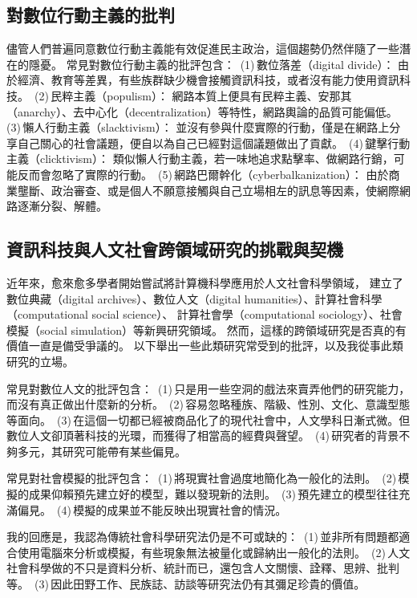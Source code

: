 \documentclass[letterpaper, 10pt, conference]{ieeeconf}   %
\begin{document}
\begin{CJK*}{UTF8}{bsmi}
\subsection*{對數位行動主義的批判}

儘管人們普遍同意數位行動主義能有效促進民主政治，這個趨勢仍然伴隨了一些潛在的隱憂。
常見對數位行動主義的批評包含：
\,(1)\,數位落差（digital divide）：
由於經濟、教育等差異，有些族群缺少機會接觸資訊科技，或者沒有能力使用資訊科技。
\,(2)\,民粹主義（populism）：
網路本質上便具有民粹主義、安那其（anarchy）、去中心化（decentralization）等特性，網路輿論的品質可能偏低。
\,(3)\,懶人行動主義（slacktivism）：
並沒有參與什麼實際的行動，僅是在網路上分享自己關心的社會議題，便自以為自己已經對這個議題做出了貢獻。
\,(4)\,鍵擊行動主義（clicktivism）：
類似懶人行動主義，若一味地追求點擊率、做網路行銷，可能反而會忽略了實際的行動。
\,(5)\,網路巴爾幹化（cyberbalkanization）：
由於商業壟斷、政治審查、或是個人不願意接觸與自己立場相左的訊息等因素，使網際網路逐漸分裂、解體。

\subsection*{資訊科技與人文社會跨領域研究的挑戰與契機}

近年來，愈來愈多學者開始嘗試將計算機科學應用於人文社會科學領域，
建立了數位典藏（digital archives）、數位人文（digital humanities）、計算社會科學（computational social science）、
計算社會學（computational sociology）、社會模擬（social simulation）等新興研究領域。
然而，這樣的跨領域研究是否真的有價值一直是備受爭議的。
以下舉出一些此類研究常受到的批評，以及我從事此類研究的立場。

常見對數位人文的批評包含：
\,(1)\,只是用一些空洞的戲法來賣弄他們的研究能力，而沒有真正做出什麼新的分析。
\,(2)\,容易忽略種族、階級、性別、文化、意識型態等面向。
\,(3)\,在這個一切都已經被商品化了的現代社會中，人文學科日漸式微。但數位人文卻頂著科技的光環，而獲得了相當高的經費與聲望。
\,(4)\,研究者的背景不夠多元，其研究可能帶有某些偏見。

常見對社會模擬的批評包含：
\,(1)\,將現實社會過度地簡化為一般化的法則。
\,(2)\,模擬的成果仰賴預先建立好的模型，難以發現新的法則。
\,(3)\,預先建立的模型往往充滿偏見。
\,(4)\,模擬的成果並不能反映出現實社會的情況。

我的回應是，我認為傳統社會科學研究法仍是不可或缺的：
\,(1)\,並非所有問題都適合使用電腦來分析或模擬，有些現象無法被量化或歸納出一般化的法則。
\,(2)\,人文社會科學做的不只是資料分析、統計而已，還包含人文關懷、詮釋、思辨、批判等。
\,(3)\,因此田野工作、民族誌、訪談等研究法仍有其彌足珍貴的價值。


\end{CJK*}
\end{document}
